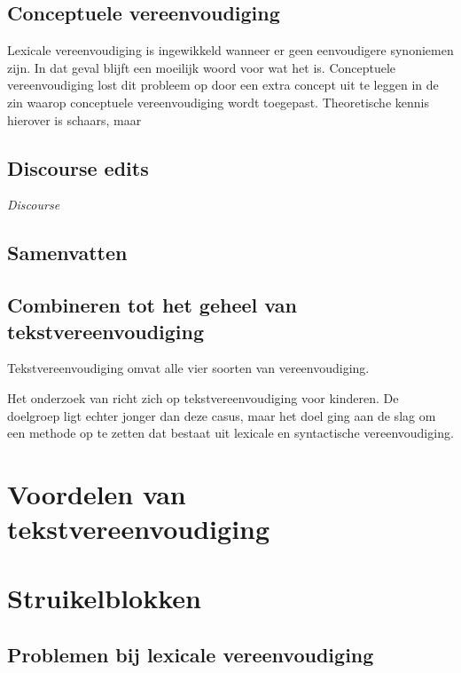 \subsection{Conceptuele vereenvoudiging}

Lexicale vereenvoudiging is ingewikkeld wanneer er geen eenvoudigere synoniemen zijn. In dat geval blijft een moeilijk woord voor wat het is. Conceptuele vereenvoudiging lost dit probleem op door een extra concept uit te leggen in de zin waarop conceptuele vereenvoudiging wordt toegepast. Theoretische kennis hierover is schaars, maar \textcite{Siddharthan2006}

\subsection{Discourse edits}

\textit{Discourse}

\subsection{Samenvatten}


\subsection{Combineren tot het geheel van tekstvereenvoudiging}

Tekstvereenvoudiging omvat alle vier soorten van vereenvoudiging.

Het onderzoek van \textcite{DeBelder2010} richt zich op tekstvereenvoudiging voor kinderen. De doelgroep ligt echter jonger dan deze casus, maar het doel ging aan de slag om een methode op te zetten dat bestaat uit lexicale en syntactische vereenvoudiging.



\section{Voordelen van tekstvereenvoudiging}

\section{Struikelblokken}

\subsection{Problemen bij lexicale vereenvoudiging}


